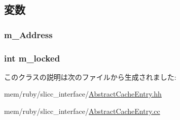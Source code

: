 \subsection{変数}
\hypertarget{classAbstractCacheEntry_ab635563c3a8accc6501e891059954ef2}{
\subsubsection[{m\_\-Address}]{ {\bf m\_\-Address}}}
\label{classAbstractCacheEntry_ab635563c3a8accc6501e891059954ef2}
\hypertarget{classAbstractCacheEntry_a512dafa8354b9b621e1c022db0800cc0}{
\subsubsection[{m\_\-locked}]{\setlength{\rightskip}{0pt plus 5cm}int {\bf m\_\-locked}}}
\label{classAbstractCacheEntry_a512dafa8354b9b621e1c022db0800cc0}


このクラスの説明は次のファイルから生成されました:\begin{DoxyCompactItemize}
\item 
mem/ruby/slicc\_\-interface/\hyperlink{AbstractCacheEntry_8hh}{AbstractCacheEntry.hh}\item 
mem/ruby/slicc\_\-interface/\hyperlink{AbstractCacheEntry_8cc}{AbstractCacheEntry.cc}\end{DoxyCompactItemize}
